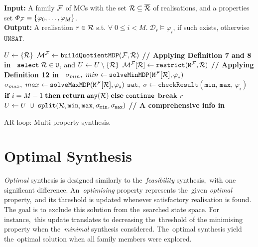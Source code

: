 \begin{algorithm}[h!]
\hspace*{\algorithmicindent} \textbf{Input:} A family $\mathcal{F}$ of MCs with the set $\mathcal{R} \subseteq \overline{\mathcal{R}}$ of realisations, and a properties set $\varPhi_{\mathcal{F}} = \{\varphi_0, \dots, \varphi_M \}$. \\
\hspace*{\algorithmicindent} \textbf{Output:}  A realisation $r \in \mathcal{R}$ s.t. $\forall \; 0 \leq i < M. \; \mathcal{D}_r \models \varphi_i$, if such exists, otherwise $\mathtt{UNSAT}$. \\
\vspace*{-1.5em}
\begin{algorithmic}[1]
    \STATE $U \leftarrow \{ \mathcal{R} \}$
    \STATE $\mathcal{M}^{\mathcal{F}} \leftarrow \mathtt{buildQuotientMDP(\mathcal{F}, \mathcal{R})}$ \hfill \textbf{// Applying Definition 7 and 8 in~\cite{cegar}}
        \STATE $\mathtt{select \; \mathcal{R} \in U}$, and $U \leftarrow U \setminus \{ \mathcal{R} \}$
        \STATE $\mathcal{M}^{\mathcal{F}}[\mathcal{R}] \leftarrow \mathtt{restrict(M^{\mathcal{F}}, \mathcal{R})}$ \hfill \textbf{// Applying Definition 12 in~\cite{cegar}}
            \STATE $\sigma_{min}, \ min \leftarrow \mathtt{solveMinMDP(M^{\mathcal{F}}[\mathcal{R}], \varphi_{i})}$
            \STATE $\sigma_{max}, \ max \leftarrow \mathtt{solveMaxMDP(M^{\mathcal{F}}[\mathcal{R}], \varphi_{i})}$
            \STATE $\mathtt{sat}, \; \sigma \leftarrow \mathtt{checkResult}(\mathtt{min}, \, \mathtt{max}, \, \varphi_i)$
                \STATE $\mathbf{if} \; i = M-1 \; \mathbf{then} \; \mathbf{return} \; \mathtt{any(\mathcal{R})} \; \mathbf{else} \; \mathtt{continue}$
            \ENDIF
                \STATE $\mathbf{break}$
            \ENDIF
                \RETURN $r$
            \ENDIF
            \STATE $U \leftarrow U \; \cup \; \mathtt{split(\mathcal{R}, min, max, \sigma_{min}, \sigma_{max})}$ \hfill \textbf{// A comprehensive info in~\cite{cegar}} 
        \ENDFOR
    \ENDWHILE
\end{algorithmic}
\caption{AR loop: Multi-property synthesis.}
\label{alg:ar_multi}
\end{algorithm}

\section{Optimal Synthesis}
\textit{Optimal} synthesis is designed similarly to the~\textit{feasibility} synthesis,~with one significant difference.
An~\textit{optimising} property represents the~given \textit{optimal} property,~and its threshold is updated whenever satisfactory realisation is found.
The goal is to exclude this solution from the~searched state space.
For instance,~this update translates to decreasing the~threshold of the minimising property when the~\textit{minimal} synthesis considered.
The~optimal synthesis yield the~optimal solution when all family members were explored.

